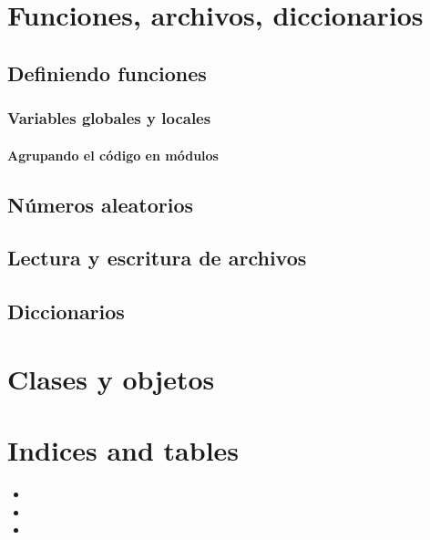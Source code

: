 \documentclass[a4paper,12pt,spanish]{sphinxmanual}
\begin{document}
\chapter{Funciones, archivos, diccionarios}
\label{Unidad04::doc}\label{Unidad04:funciones-archivos-diccionarios}

\section{Definiendo funciones}
\label{Unidad04:definiendo-funciones}

\subsection{Variables globales y locales}
\label{Unidad04:variables-globales-y-locales}

\subsubsection{Agrupando el código en módulos}
\label{Unidad04:agrupando-el-codigo-en-modulos}

\section{Números aleatorios}
\label{Unidad04:numeros-aleatorios}

\section{Lectura y escritura de archivos}
\label{Unidad04:lectura-y-escritura-de-archivos}

\section{Diccionarios}
\label{Unidad04:diccionarios}

\chapter{Clases y objetos}
\label{Unidad05::doc}\label{Unidad05:clases-y-objetos}

\chapter{Indices and tables}
\label{index:indices-and-tables}\begin{itemize}
\item {} 

\item {} 

\item {} 

\end{itemize}



\renewcommand{\indexname}{Índice}
\printindex
\end{document}

